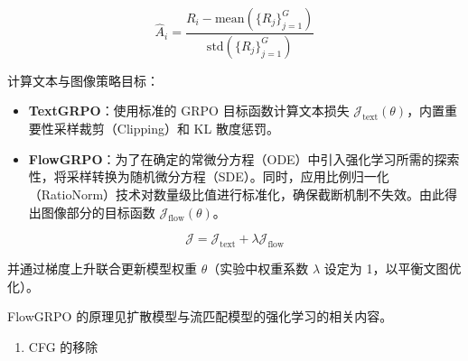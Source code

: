 \[
\hat A_i=
\frac{R_i-\mathrm{mean}(\{R_j\}_{j=1}^{G})}
{\mathrm{std}(\{R_j\}_{j=1}^{G})}
\]

计算文本与图像策略目标：

\begin{itemize}
\tightlist
\item
  \textbf{TextGRPO}：使用标准的 GRPO 目标函数计算文本损失 \(\mathcal{J}_{\mathrm{text}}(\theta)\)，内置重要性采样裁剪（Clipping）和 KL 散度惩罚。
\item
  \textbf{FlowGRPO}：为了在确定的常微分方程（ODE）中引入强化学习所需的探索性，将采样转换为随机微分方程（SDE）。同时，应用比例归一化（RatioNorm）技术对数量级比值进行标准化，确保截断机制不失效。由此得出图像部分的目标函数 \(\mathcal{J}_{\mathrm{flow}}(\theta)\)。
\end{itemize}

\[
\mathcal{J}
=\mathcal{J}_{\mathrm{text}}+\lambda\mathcal{J}_{\mathrm{flow}}
\]

并通过梯度上升联合更新模型权重 \(\theta\)（实验中权重系数 \(\lambda\) 设定为 1，以平衡文图优化）。

FlowGRPO 的原理见扩散模型与流匹配模型的强化学习的相关内容。

\begin{enumerate}
\def\labelenumi{\arabic{enumi}.}
\setcounter{enumi}{2}
\tightlist
\item
  CFG 的移除
\end{enumerate}

